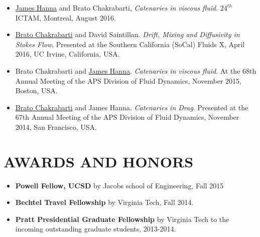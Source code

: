 \documentclass[10pt]{res} %
\begin{document}
\begin{resume}
\begin{itemize}
	\item \underline{James Hanna} and Brato Chakrabarti, \textit{Catenaries in viscous fluid}. $24^{th}$ ICTAM, Montreal, August 2016.
	
	\item \underline{Brato Chakrabarti} and David Saintillan. \textit{Drift, Mixing and Diffusivity in 
		Stokes Flow}. Presented at the Southern California (SoCal) Fluids X, April 2016, UC Irvine, California, USA.
	
	\item Brato Chakrabarti and \underline{James Hanna}. \textit{Catenaries in viscous fluid}. At the 68th Annual Meeting of the APS Division of Fluid Dynamics, November 2015,
	Boston, USA. 
	
	\item \underline{Brato Chakrabarti} and James Hanna. \textit{Catenaries in Drag}. Presented at the 67th Annual Meeting of the APS Division of Fluid Dynamics, November 2014,
	San Francisco, USA. 
	
	
\end{itemize}

\vspace*{-0.15cm}
\section{{AWARDS AND HONORS}}
\vspace*{6mm}
	\begin{itemize}
		\item \textbf{Powell Fellow, UCSD} by Jacobs school of Engineering, Fall 2015
		
		\item \textbf{Bechtel Travel Fellowship} by Virginia Tech, Fall 2014.
		
		\item \textbf{Pratt Presidential Graduate Fellowship} by Virginia Tech to the incoming outstanding graduate students, 2013-2014.
		

\end{itemize}
\end{resume}
\end{document}
